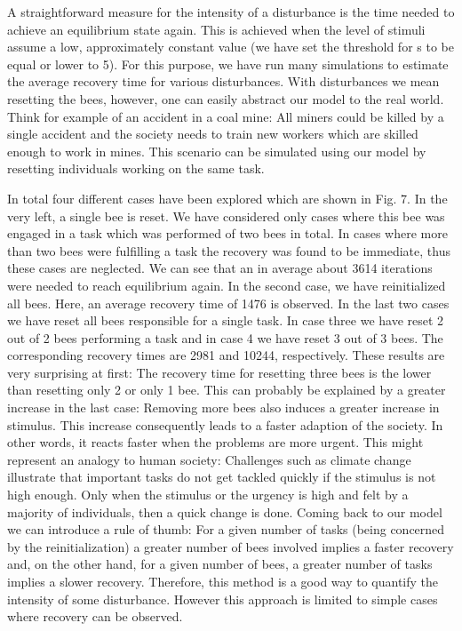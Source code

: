 A straightforward measure for the intensity of a disturbance is the time needed to achieve an equilibrium state again. This is achieved when the level of stimuli assume a low, approximately constant value (we have set the threshold for s to be equal or lower to 5). For this purpose, we have run many simulations to estimate the average recovery time for various disturbances. With disturbances we mean resetting the bees, however, one can easily abstract our model to the real world. Think for example of an accident in a coal mine: All miners could be killed by a single accident and the society needs to train new workers which are skilled enough to work in mines. This scenario can be simulated using our model by resetting individuals working on the same task. 

In total four different cases have been explored which are shown in Fig. 7. In the very left, a single bee is reset. We have considered only cases where this bee was engaged in a task which was performed of two bees in total. In cases where more than two bees were fulfilling a task the recovery was found to be immediate, thus these cases are neglected. We can see that an in average about 3614 iterations were needed to reach equilibrium again. In the second case, we have reinitialized all bees. Here, an average recovery time of 1476 is observed. In the last two cases we have reset all bees responsible for a single task. In case three we have reset 2 out of 2 bees performing a task and in case 4 we have reset 3 out of 3 bees. The corresponding recovery times are 2981 and 10244, respectively. These results are very surprising at first: The recovery time for resetting three bees is the lower than resetting only 2 or only 1 bee. This can probably be explained by a greater increase in the last case: Removing more bees also induces a greater increase in stimulus. This increase consequently leads to a faster adaption of the society. In other words, it reacts faster when the problems are more urgent. This might represent an analogy to human society: Challenges such as climate change illustrate that important tasks do not get tackled quickly if the stimulus is not high enough. Only when the stimulus or the urgency is high and felt by a majority of individuals, then a quick change is done. Coming back to our model we can introduce a rule of thumb: For a given number of tasks (being concerned by the reinitialization) a greater number of bees involved implies a faster recovery and, on the other hand, for a given number of bees, a greater number of tasks implies a slower recovery.
Therefore, this method is a good way to quantify the intensity of some disturbance. However this approach is limited to simple cases where recovery can be observed.

